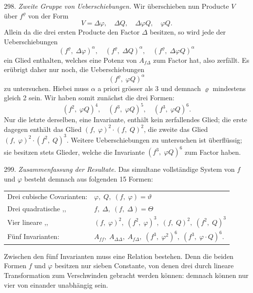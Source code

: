 \documentclass[11pt]{article}
\providecommand{\weberpage}[1]{}
\let\Delta\varDelta
\let\Theta\varTheta
\begin{document}
298. \textit{Zweite Gruppe von Ueberschiebungen.} Wir überschieben nun Producte $V$ über $f^\varrho$ von der Form
\[
V = \Delta\varphi, \quad \Delta Q, \quad \Delta\varphi Q, \quad \varphi Q.
\]
Allein da die drei ersten Producte den Factor $\Delta$ besitzen, so wird jede der Ueberschiebungen
\[
(f^\varrho, \; \Delta\varphi)^\alpha, \quad (f^\varrho, \; \Delta Q)^\alpha, \quad (f^\varrho, \; \Delta\varphi Q)^\alpha
\]
ein Glied enthalten, welches eine Potenz von $A_{f\Delta}$ zum Factor hat, also zerfällt. Es erübrigt daher nur noch, die Ueberschiebungen
\[
(f^\varrho, \; \varphi Q)^\alpha
\]
zu untersuchen. Hiebei muss $\alpha$ a priori grösser als 3 und demnach $\varrho$ mindestens gleich 2 sein. Wir haben somit zunächst die drei Formen:
\[
(f^2, \; \varphi Q)^4, \quad (f^3, \; \varphi Q)^5, \quad (f^3, \; \varphi Q)^6.
\]
Nur die letzte derselben, eine Invariante, enthält kein zerfallendes Glied; die erste dagegen enthält das Glied $(f, \; \varphi)^2 \cdot (f, \; Q)^2$, die zweite das Glied $(f, \; \varphi)^2 \cdot (f^2, \; Q)^3$. Weitere Ueberschiebungen zu untersuchen ist überflüssig; sie besitzen stets Glieder, welche die Invariante $(f^3, \; \varphi Q)^6$ zum Factor haben.

299. \textit{Zusammenfassung der Resultate.} Das simultane vollständige System von $f$ und $\varphi$ besteht demnach aus folgenden 15 Formen:


\weberpage{323}
\begin{tabular}{@{}ll@{}}
Drei cubische Covarianten: & $\varphi, \; Q, \; (f, \; \varphi) = \vartheta$ \\
Drei quadratische \quad ,, & $f, \; \Delta, \; (f, \; \Delta) = \Theta$ \\
Vier lineare \quad ,, & $(f, \; \varphi)^2, \; (f^2, \; \varphi)^3, \; (f, \; Q)^2, \; (f^2, \; Q)^3$ \\
Fünf Invarianten: & $A_{ff}, \; A_{\Delta\Delta}, \; A_{f\Delta}, \; (f^3, \; \varphi^2)^6, \; (f^3, \; \varphi \cdot Q)^6.$ \\
\end{tabular}

Zwischen den fünf Invarianten muss eine Relation bestehen. Denn die beiden Formen $f$ und $\varphi$ besitzen nur sieben Constante, von denen drei durch lineare Transformation zum Verschwinden gebracht werden können: demnach können nur vier von einander unabhängig sein.
\end{document}
